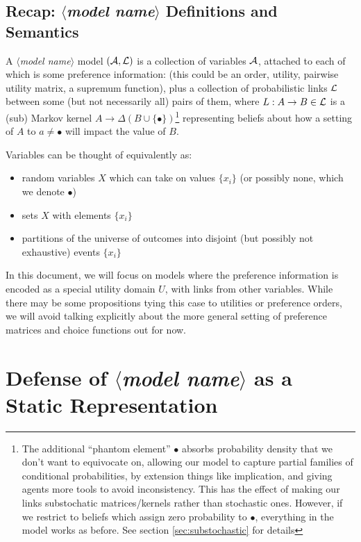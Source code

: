 \documentclass{article}
\newcommand\modelname{{\color{blue!50!black}$\langle$\itshape model name$\rangle$ }}
\begin{document}
	\subsection*{Recap: \modelname Definitions and Semantics}
	\begin{defn}
		A \modelname model $(\cal A, L)$ is a collection of variables $\cal A$, attached to each of which is some preference information: (this could be an order, utility, pairwise utility matrix, a supremum function), plus a collection of probabilistic links $\cal L$ between some (but not necessarily all) pairs of them, where $L: A\to B \in \cal L$ is a (sub) Markov kernel $A \to \Delta (B \cup \{\bullet\})$\footnote{The additional ``phantom element'' $\bullet$ absorbs probability density that we don't want to equivocate on, allowing our model to capture partial families of conditional probabilities, by extension things like implication, and giving agents more tools to avoid inconsistency. This has the effect of making our links substochatic matrices/kernels rather than stochastic ones. However, if we restrict to beliefs which assign zero probability to $\bullet$, everything in the model works as before. See section \ref{sec:substochastic} for details} representing beliefs about how a setting of $A$ to $a \neq \bullet$ will impact the value of $B$. 
	\end{defn}

	Variables can be thought of equivalently as:
	\begin{itemize}[nosep]
		\item random variables $X$ which can take on values $\{x_i\}$ (or possibly none, which we denote $\bullet$)
		\item sets $X$ with elements $\{x_i\}$
		\item partitions of the universe of outcomes into disjoint (but possibly not exhaustive) events $\{x_i\}$
	\end{itemize}
	
	In this document, we will focus on models where the preference information is encoded as a special utility domain $U$, with links from other variables. While there may be some propositions tying this case to utilities or preference orders, we will avoid talking explicitly about the more general setting of preference matrices and choice functions out for now.
	
	
	\section{Defense of \modelname as a Static Representation }
\end{document}
